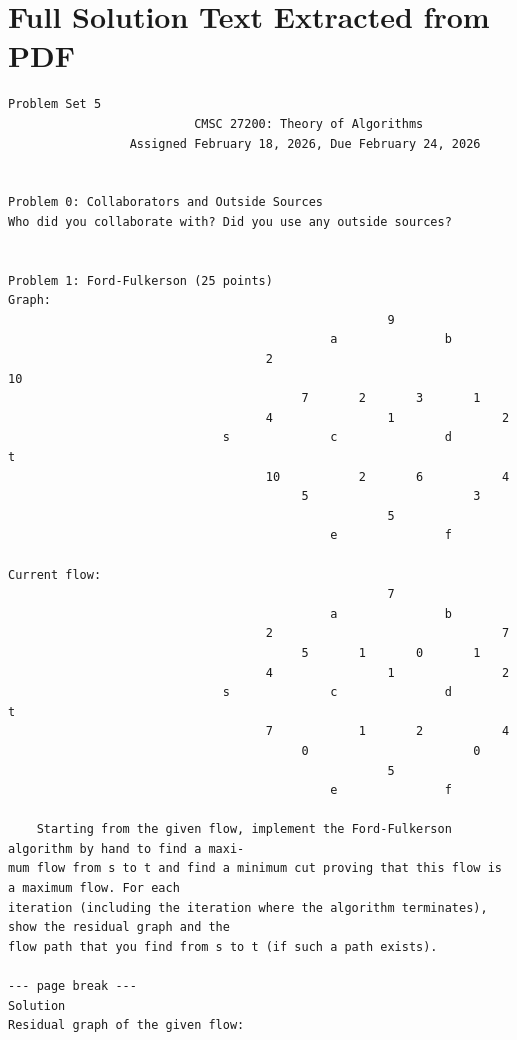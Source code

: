 \documentclass[12pt]{article}
\begin{document}
\newpage
\section*{Full Solution Text Extracted from PDF}
\begin{Verbatim}[breaklines=true,fontsize=\small]
                                     Problem Set 5
                          CMSC 27200: Theory of Algorithms
                 Assigned February 18, 2026, Due February 24, 2026


Problem 0: Collaborators and Outside Sources
Who did you collaborate with? Did you use any outside sources?


Problem 1: Ford-Fulkerson (25 points)
Graph:
                                                     9
                                             a               b
                                    2                                10
                                         7       2       3       1
                                    4                1               2
                              s              c               d            t
                                    10           2       6           4
                                         5                       3
                                                     5
                                             e               f

Current flow:
                                                     7
                                             a               b
                                    2                                7
                                         5       1       0       1
                                    4                1               2
                              s              c               d            t
                                    7            1       2           4
                                         0                       0
                                                     5
                                             e               f

    Starting from the given flow, implement the Ford-Fulkerson algorithm by hand to find a maxi-
mum flow from s to t and find a minimum cut proving that this flow is a maximum flow. For each
iteration (including the iteration where the algorithm terminates), show the residual graph and the
flow path that you find from s to t (if such a path exists).

--- page break ---
Solution
Residual graph of the given flow:


\end{Verbatim}
\end{document}
